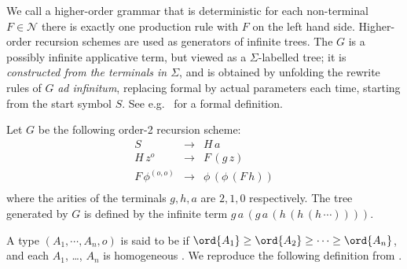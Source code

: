 We call  a higher-order
grammar that is deterministic \ie for each non-terminal $F \in
\mathcal{N}$ there is exactly one production rule with $F$ on the
left hand side. Higher-order recursion schemes are used as
generators of infinite trees. The  $G$ is a possibly infinite applicative term, but
viewed as a $\Sigma$-labelled tree; it is \emph{constructed from the
terminals in $\Sigma$}, and is obtained by unfolding the rewrite
rules of $G$ \emph{ad infinitum}, replacing formal by actual
parameters each time, starting from the start symbol $S$. See
e.g.~\cite{KNU02} for a formal definition.

\pssetcomptree
{}
\begin{example}\rm\label{eg:running}
  Let $G$ be the following order-2 recursion scheme:
\[\begin{array}{rll}
  S & \rightarrow & H \, a\\
  H \, z^o & \rightarrow & F \, (g \,
  z)\\
  F \, \phi^{(o, o)} & \rightarrow & \phi \, (\phi \, (F \, h))\\
\end{array}\]
where the arities of the terminals $g, h, a$ are $2, 1, 0$ respectively.
The tree generated by $G$ is defined by the infinite term $g \, a \, (g \, a \, (h \, (h \, (h \,
\cdots))))$.%

\end{example}

A type $(A_1, \cdots, A_n, o)$ is said to be  if
$\ord{A_1} \geq \ord{A_2}\geq \cdots \geq \ord{A_n}$, and each $A_1$,
\ldots, $A_n$ is homogeneous \cite{KNU02}.  We reproduce the following
definition from \cite{KNU02}.

